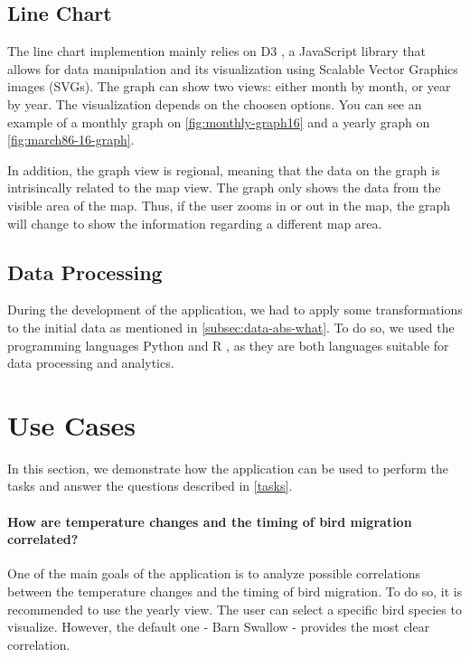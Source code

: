 \documentclass[journal]{vgtc}                %
\begin{document}
\subsection{Line Chart}

The line chart implemention mainly relies on D3 \cite{bostock2011d3}, a JavaScript library that allows for data manipulation and its visualization using Scalable Vector Graphics images (SVGs). The graph can show two views: either month by month, or year by year. The visualization depends on the choosen options. You can see an example of a monthly graph on \autoref{fig:monthly-graph16} and a yearly graph on \autoref{fig:march86-16-graph}.

In addition, the graph view is regional, meaning that the data on the graph is intrisincally related to the map view. The graph only shows the data from the visible area of the map. Thus, if the user zooms in or out in the map, the graph will change to show the information regarding a different map area.

\subsection{Data Processing}

During the development of the application, we had to apply some transformations to the initial data as mentioned in \autoref{subsec:data-abs-what}. To do so, we used the programming languages Python \cite{rossum1995python} and R \cite{rproject}, as they are both languages suitable for data processing and analytics.


\section{Use Cases}

In this section, we demonstrate how the application can be used to perform the tasks and answer the questions described in \autoref{tasks}.

\paragraph{How are temperature changes and the timing of bird migration correlated?}

One of the main goals of the application is to analyze possible correlations between the temperature changes and the timing of bird migration. To do so, it is recommended to use the yearly view. The user can select a specific bird species to visualize. However, the default one - Barn Swallow - provides the most clear correlation.
\end{document}
